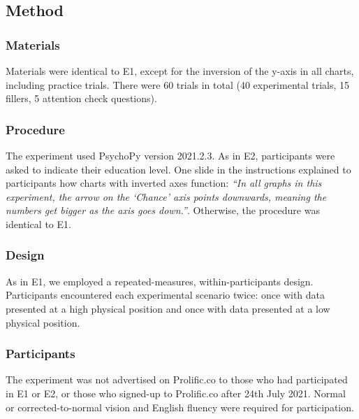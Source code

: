 \documentclass[journal]{vgtc}                %
\begin{document}
\hypertarget{method-1}{%
\subsection{Method}\label{method-1}}

\hypertarget{materials-2}{%
\subsubsection{Materials}\label{materials-2}}

Materials were identical to E1, except for the inversion of the y-axis
in all charts, including practice trials. There were 60 trials in total
(40 experimental trials, 15 fillers, 5 attention check questions).

\hypertarget{procedure-2}{%
\subsubsection{Procedure}\label{procedure-2}}

The experiment used PsychoPy version 2021.2.3. As in E2, participants were asked to indicate their education level. One
slide in the instructions explained to participants how charts with
inverted axes function: \emph{``In all graphs in this experiment, the arrow on
the `Chance' axis points downwards, meaning the numbers get bigger as
the axis goes down.''}. Otherwise, the procedure was identical to E1.

\hypertarget{design-2}{%
\subsubsection{Design}\label{design-2}}

As in E1, we employed a repeated-measures, within-participants design.
Participants encountered each experimental scenario twice: once with
data presented at a high physical position and once with data presented
at a low physical position.

\hypertarget{participants-2}{%
\subsubsection{Participants}\label{participants-2}}

The experiment was not advertised on Prolific.co to those who had
participated in E1 or E2, or those who signed-up to Prolific.co after
24th July 2021. Normal or corrected-to-normal vision and English fluency
were required for participation.
\end{document}
